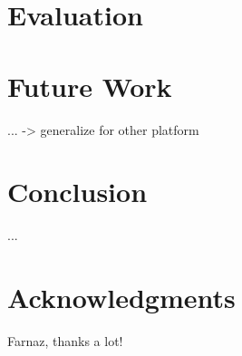 \documentclass{sigchi}
\begin{document}
\section{Evaluation}

\section{Future Work}
... -> generalize for other platform

\section{Conclusion}
...

\section{Acknowledgments}
Farnaz, thanks a lot!

%
%
%
%
%
\balance



\end{document}
